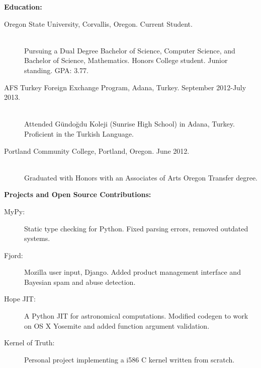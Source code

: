 \documentclass[11pt]{article}
\begin{document}
\bigskip

{\Large \bf Education:}
\begin{description}
	\item[Oregon State University, Corvallis, Oregon.
		\hfill Current Student.]
		\hfill \\
		Pursuing a Dual Degree Bachelor of Science, Computer Science,
		and Bachelor of Science, Mathematics.
		Honors College student. Junior standing. GPA: 3.77.
		
	\item[AFS Turkey Foreign Exchange Program, Adana, Turkey.
		\hfill September 2012-July 2013.]
		\hfill \\
		Attended G{\" u}ndo{\u g}du Koleji (Sunrise High School) in Adana, 
		Turkey. Proficient in the Turkish Language.

	\item[Portland Community College, Portland, Oregon.
		\hfill June 2012.]
		\hfill \\
		Graduated with Honors with an Associates of Arts 
		Oregon Transfer degree.

\end{description}

\bigskip

{\Large \bf Projects and Open Source Contributions:}
\begin{description}
\item[MyPy:] Static type checking for Python. Fixed parsing errors,
	removed outdated systems.
\item[Fjord:] Mozilla user input, Django. Added product management interface
	and Bayesian spam and abuse detection.
\item[Hope JIT:] A Python JIT for astronomical computations. Modified codegen
to work on OS X Yosemite and added function argument validation.
\item[Kernel of Truth:] Personal project implementing a i586 C kernel written
	from scratch.
\end{description}
\end{document}
